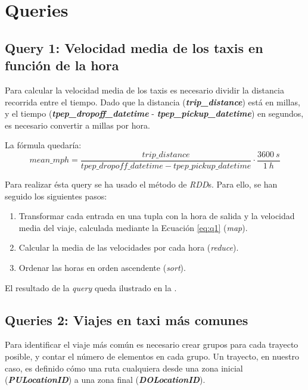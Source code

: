 \section{Queries}


\subsection{Query 1: Velocidad media de los taxis en función de la hora}
Para calcular la velocidad media de los taxis es necesario dividir la distancia recorrida entre el tiempo. Dado que la distancia (\textbf{\textit{trip\_distance}}) está en millas, y el tiempo (\textbf{\textit{tpep\_dropoff\_datetime}} - \textbf{\textit{tpep\_pickup\_datetime}}) en segundos, es necesario convertir a millas por hora.

La fórmula quedaría:
\begin{equation}\label{eq:q1}
  mean\_mph = \frac{trip\_distance}{tpep\_dropoff\_datetime - tpep\_pickup\_datetime} \cdot \frac{3600\ s}{1\ h}
\end{equation}


Para realizar ésta query se ha usado el método de \textit{RDD}s. Para ello, se han seguido los siguientes pasos:
\begin{enumerate}
  \item Transformar cada entrada en una tupla con la hora de salida y la velocidad media del viaje, calculada mediante la Ecuación \ref{eq:q1} (\textit{map}).
  \item Calcular la media de las velocidades por cada hora (\textit{reduce}).
  \item Ordenar las horas en orden ascendente (\textit{sort}).
\end{enumerate}

\noindent
El resultado de la \textit{query} queda ilustrado en la .




\subsection{Queries 2: Viajes en taxi más comunes}
Para identificar el viaje más común es necesario crear grupos para cada trayecto posible, y contar el número de elementos en cada grupo.
Un trayecto, en nuestro caso, es definido cómo una ruta cualquiera desde una zona inicial (\textbf{\textit{PULocationID}}) a una zona final (\textbf{\textit{DOLocationID}}).

